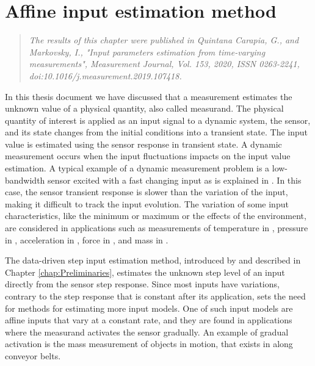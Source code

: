 \glsresetall

\chapter{Affine input estimation method}\label{chap:AffineInput}


\begin{quote}
\vspace{-0.5cm}
\emph{The results of this chapter were published in Quintana Carapia, G., and Markovsky, I.,
"Input parameters estimation from time-varying measurements", Measurement Journal, Vol. 153, 2020,
ISSN 0263-2241, doi:10.1016/j.measurement.2019.107418. \nocite{QuintanaMEAS} }\vfill{}
\end{quote}



\color{blue} 
In this thesis document we have discussed that a measurement estimates the unknown value of a physical quantity, also called measurand.
The physical quantity of interest is applied as an input signal to a dynamic system, the sensor, and its state changes from the initial conditions into a transient state.
The input value is estimated using the sensor response in transient state.
A dynamic measurement occurs when the input fluctuations impacts on the input value estimation.
A typical example of a dynamic measurement problem is a low-bandwidth sensor excited with a fast changing input as is explained in \citet{Dienstfrey14}.
In this case, the sensor transient response is slower than the variation of the input, making it difficult to track the input evolution.
The variation of some input characteristics, like the minimum or maximum or the effects of the environment, are considered in applications such as measurements of temperature in \citet{Saggin01}, pressure in \citet{Matthews14}, acceleration in \citet{Link07}, force in \citet{Vlajic16, Hessling08a}, and mass in \cite{Shu93, Boschetti13}.

The data-driven step input estimation method, introduced by \citet{Markovsky15cep} and described in Chapter \ref{chap:Preliminaries},
estimates the unknown step level of an input directly from the sensor step response.
Since most inputs have variations, contrary to the step response that is constant after its application, sets the need for methods for estimating more input models.
One of such input models are affine inputs that vary at a constant rate, and they are found in applications where the measurand activates the sensor gradually. 
An example of gradual activation is the mass measurement of objects in motion, that exists in along conveyor belts.

